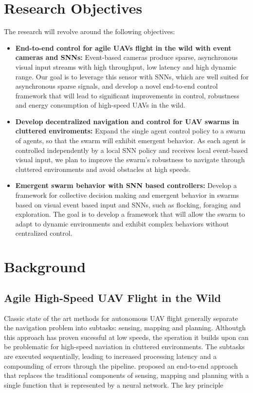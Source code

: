 \documentclass{article}
\begin{document}
\section{Research Objectives}
The research will revolve around the following objectives:    
\begin{itemize}
    \item \textbf{End-to-end control for agile UAVs flight in the wild with event cameras and SNNs:}
    Event-based cameras produce sparse, asynchronous visual input streams with high throughput, low latency and high dynamic range. Our goal is to leverage this sensor with SNNs, which are well suited for asynchronous sparse signals, and develop a novel end-to-end control framework that will lead to significant improvements in control, robustness and energy consumption of high-speed UAVs in the wild.
          
    \item \textbf{Develop decentralized navigation and control for UAV swarms in cluttered enviroments:} 
    Expand the single agent control policy to a swarm of agents, so that the swarm will exhibit emergent behavior. As each agent is controlled independently by a local SNN policy and receives local event-based visual input, we plan to improve the swarm's robustness to navigate through cluttered environments and avoid obstacles at high speeds.
            
    \item \textbf{Emergent swarm behavior with SNN based controllers:}
    Develop a framework for collective decision making and emergent behavior in swarms based on visual event based input and SNNs, such as flocking, foraging and exploration. The goal is to develop a framework that will allow the swarm to adapt to dynamic environments and exhibit complex behaviors without centralized control.
\end{itemize}

\section{Background}
\subsection{Agile High-Speed UAV Flight in the Wild}
Classic state of the art methods for autonomous UAV flight generally separate the navigation problem into subtasks: sensing, mapping and planning. Althoutgh this approach has proven sucessful at low speeds, the speration it builds upon can be problematic for high-speed naviation in cluttered environments. The subtasks are executed sequentially, leading to increased processing latency and a compounding of errors through the pipeline. \citeauthor{loquercioLearningHighSpeedFlight2021} \cite{loquercioLearningHighSpeedFlight2021} proposed an end-to-end approach that replaces the traditional components of sensing, mapping and planning with a single function that is represented by a neural network. The key principle 
\end{document}
